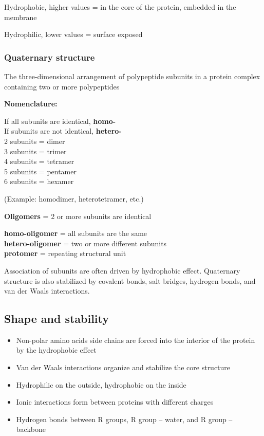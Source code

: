 \documentclass[letterpaper, 12pt]{article}
\begin{document}
Hydrophobic, higher values = in the core of the protein, embedded in the membrane

Hydrophilic, lower values = surface exposed

\subsubsection*{Quaternary structure}

The three-dimensional arrangement of polypeptide subunits in a protein complex containing two or more polypeptides

\textbf{Nomenclature:}

If all subunits are identical, \textbf{homo-} \\
If subunits are not identical, \textbf{hetero-} \\

2 subunits = dimer \\
3 subunits = trimer \\
4 subunits = tetramer \\
5 subunits = pentamer \\
6 subunits = hexamer

(Example: homodimer, heterotetramer, etc.)

\textbf{Oligomers} = 2 or more subunits are identical

\textbf{homo-oligomer} = all subunits are the same \\
\textbf{hetero-oligomer} = two or more different subunits \\
\textbf{protomer} = repeating structural unit

Association of subunits are often driven by hydrophobic effect. Quaternary structure is also stabilized by covalent bonds, salt bridges, hydrogen bonds, and van der Waals interactions.

\subsection*{Shape and stability}

\begin{itemize}
\item Non-polar amino acids side chains are forced into the interior of the protein by the hydrophobic effect
\item Van der Waals interactions organize and stabilize the core structure
\item Hydrophilic on the outside, hydrophobic on the inside
\item Ionic interactions form between proteins with different charges
\item Hydrogen bonds between R groups, R group -- water, and R group -- backbone
\end{itemize}
\end{document}
